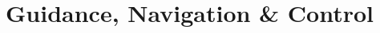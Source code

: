 \documentclass[../../main.tex]{subfiles}
\begin{document}
\chapter{Guidance, Navigation \& Control}
\thispagestyle{fancy}






\end{document}

